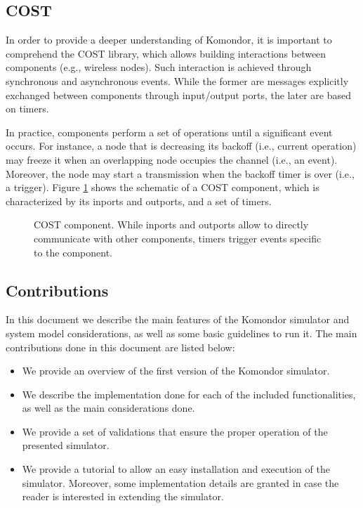 \documentclass[a4paper]{article}
\begin{document}
	\subsection{COST}
	\label{section:cost}
	In order to provide a deeper understanding of Komondor, it is important to comprehend the COST library, which allows building interactions between components (e.g., wireless nodes). Such interaction is achieved through synchronous and asynchronous events. While the former are messages explicitly exchanged between components through input/output ports, the later are based on timers. 
	
	In practice, components perform a set of operations until a significant event occurs. For instance, a node that is decreasing its backoff (i.e., current operation) may freeze it when an overlapping node occupies the channel (i.e., an event). Moreover, the node may start a transmission when the backoff timer is over (i.e., a trigger). Figure \ref{fig:cost} shows the schematic of a COST component, which is characterized by its inports and outports, and a set of timers. 
	\begin{figure}[h!]
		\centering
		\caption{COST component. While inports and outports allow to directly communicate with other components, timers trigger events specific to the component.}
		\label{fig:cost}
	\end{figure}	
	
	\subsection{Contributions}
	In this document we describe the main features of the Komondor simulator and system model considerations, as well as some basic guidelines to run it. The main contributions done in this document are listed below:
	\begin{itemize}
		\item We provide an overview of the first version of the Komondor simulator.
		\item We describe the implementation done for each of the included functionalities, as well as the main considerations done.
		\item We provide a set of validations that ensure the proper operation of the presented simulator.
		\item We provide a tutorial to allow an easy installation and execution of the simulator. Moreover, some implementation details are granted in case the reader is interested in extending the simulator.
	\end{itemize}	
	
\end{document}
